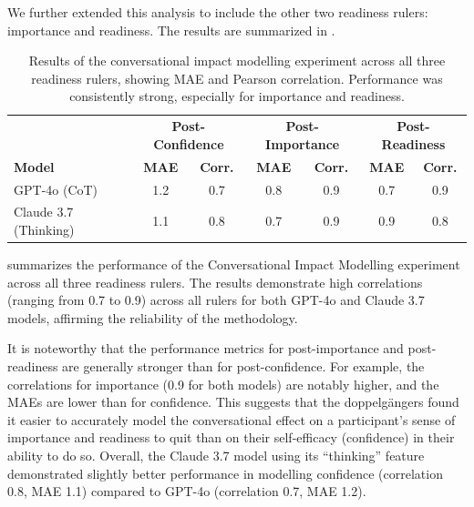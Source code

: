 We further extended this analysis to include the other two readiness rulers: importance and readiness. The results are summarized in .




\begin{table}[!ht]
	\centering
	\begin{tabular}{l|cc|cc|cc}
		\toprule
		                      & \multicolumn{2}{c|}{\textbf{Post-Confidence}} & \multicolumn{2}{c|}{\textbf{Post-Importance}} & \multicolumn{2}{c}{\textbf{Post-Readiness}}                                                  \\
		\textbf{Model}        & \textbf{MAE}                                  & \textbf{Corr.}                                & \textbf{MAE}                                & \textbf{Corr.} & \textbf{MAE} & \textbf{Corr.} \\
		\midrule
		GPT-4o (CoT)          & 1.2                                           & 0.7                                           & 0.8                                         & 0.9            & 0.7          & 0.9            \\
		Claude 3.7 (Thinking) & 1.1                                           & 0.8                                           & 0.7                                         & 0.9            & 0.9          & 0.8            \\ \hline
	\end{tabular}
	\caption[Multi-ruler conversational impact modelling results]{Results of the conversational impact modelling experiment across all three readiness rulers, showing MAE and Pearson correlation. Performance was consistently strong, especially for importance and readiness.}
	\label{tab:autoplay_results_full}
\end{table}

 summarizes the performance of the Conversational Impact Modelling experiment across all three readiness rulers. The results demonstrate high correlations (ranging from 0.7 to 0.9) across all rulers for both GPT-4o and Claude 3.7 models, affirming the reliability of the methodology.

It is noteworthy that the performance metrics for post-importance and post-readiness are generally stronger than for post-confidence. For example, the correlations for importance (0.9 for both models) are notably higher, and the MAEs are lower than for confidence. This suggests that the doppelgängers found it easier to accurately model the conversational effect on a participant's sense of importance and readiness to quit than on their self-efficacy (confidence) in their ability to do so. Overall, the Claude 3.7 model using its ``thinking'' feature demonstrated slightly better performance in modelling confidence (correlation 0.8, MAE 1.1) compared to GPT-4o (correlation 0.7, MAE 1.2).



